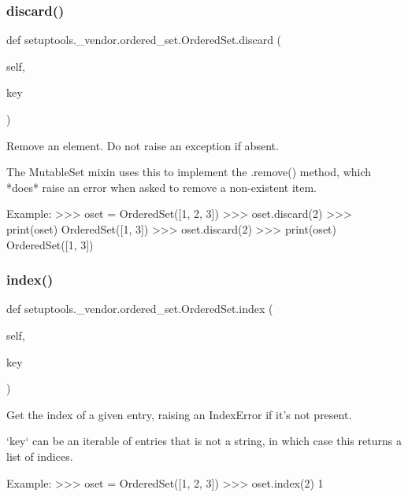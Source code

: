 \subsubsection{\texorpdfstring{discard()}{discard()}}
{\footnotesize\ttfamily def setuptools.\+\_\+vendor.\+ordered\+\_\+set.\+Ordered\+Set.\+discard (\begin{DoxyParamCaption}\item[{}]{self,  }\item[{}]{key }\end{DoxyParamCaption})}

\begin{DoxyVerb}Remove an element.  Do not raise an exception if absent.

The MutableSet mixin uses this to implement the .remove() method, which
*does* raise an error when asked to remove a non-existent item.

Example:
    >>> oset = OrderedSet([1, 2, 3])
    >>> oset.discard(2)
    >>> print(oset)
    OrderedSet([1, 3])
    >>> oset.discard(2)
    >>> print(oset)
    OrderedSet([1, 3])
\end{DoxyVerb}
 \mbox{\label{classsetuptools_1_1__vendor_1_1ordered__set_1_1OrderedSet_a4c9cbb502c5f54f77e574032bf66f9d6}} 
\subsubsection{\texorpdfstring{index()}{index()}}
{\footnotesize\ttfamily def setuptools.\+\_\+vendor.\+ordered\+\_\+set.\+Ordered\+Set.\+index (\begin{DoxyParamCaption}\item[{}]{self,  }\item[{}]{key }\end{DoxyParamCaption})}

\begin{DoxyVerb}Get the index of a given entry, raising an IndexError if it's not
present.

`key` can be an iterable of entries that is not a string, in which case
this returns a list of indices.

Example:
    >>> oset = OrderedSet([1, 2, 3])
    >>> oset.index(2)
    1
\end{DoxyVerb}
 \mbox{\label{classsetuptools_1_1__vendor_1_1ordered__set_1_1OrderedSet_a6572a9eed50439e53c6ec552276099e6}} 
